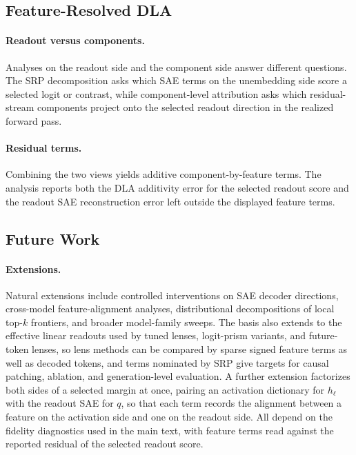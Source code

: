 \subsection{Feature-Resolved DLA}
\label{app:extended-discussion-prism-dla}

\paragraph{Readout versus components.}
Analyses on the readout side and the component side answer different questions. The SRP
decomposition asks which SAE terms on the unembedding side score a selected logit or contrast,
while component-level attribution asks which residual-stream components project onto
the selected readout direction in the realized forward pass.

\paragraph{Residual terms.}
Combining the two views yields additive component-by-feature terms. The
analysis reports both the DLA additivity error for the selected readout score
and the readout SAE reconstruction error left outside the displayed feature
terms.

\subsection{Future Work}
\label{app:extended-discussion-future-work}

\paragraph{Extensions.}
Natural extensions include controlled interventions on SAE decoder directions,
cross-model feature-alignment analyses, distributional decompositions of local
top-\(k\) frontiers, and broader model-family sweeps. The basis also
extends to the effective linear readouts used by tuned lenses,
logit-prism variants, and future-token lenses, so lens methods can be
compared by sparse signed feature terms as well as decoded tokens, and
terms nominated by SRP give targets for causal patching, ablation, and
generation-level evaluation. A further extension factorizes both sides
of a selected margin at once, pairing an activation dictionary for
\(h_\ell\) with the readout SAE for \(q\), so that each term records
the alignment between a feature on the activation side and one on the readout side. All
depend on the fidelity diagnostics used in the main text, with feature
terms read against the reported residual of the selected readout score.

